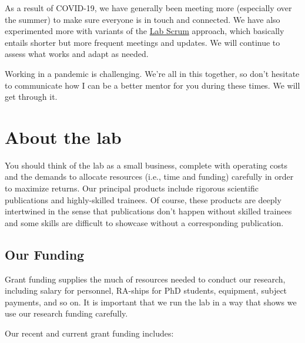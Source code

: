 \documentclass[letterpaper,11pt,oneside]{memoir}
\begin{document}
As a result of COVID-19, we have generally been meeting more (especially over the summer) to make sure everyone is in touch and connected. We have also experimented more with variants of the \href{https://labscrum.org/}{Lab Scrum} approach, which basically entails shorter but more frequent meetings and updates. We will continue to assess what works and adapt as needed.

\begin{shaded}
\noindent Working in a pandemic is challenging. We're all in this together, so don't hesitate to communicate how I can be a better mentor for you during these times. We will get through it.
\end{shaded}

\chapter{About the lab} 

You should think of the lab as a small business, complete with operating costs and the demands to allocate resources (i.e., time and funding) carefully in order to maximize returns. Our principal products include rigorous scientific publications and highly-skilled trainees. Of course, these products are deeply intertwined in the sense that publications don't happen without skilled trainees and some skills are difficult to showcase without a corresponding publication.

\section{Our Funding}

Grant funding supplies the much of resources needed to conduct our research, including salary for personnel, RA-ships for PhD students, equipment, subject payments, and so on. It is important that we run the lab in a way that shows we use our research funding carefully. 

Our recent and current grant funding includes:
\end{document}
